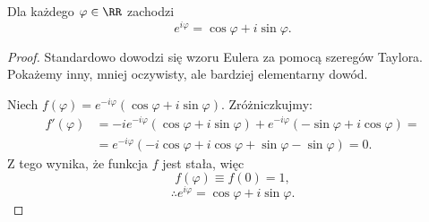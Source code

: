 \begin{theorem}
    Dla każdego $\varphi \in \RR$ zachodzi
    $$ e^{i\varphi} = \cos\varphi + i\sin\varphi. $$
\end{theorem}
\begin{proof}
    Standardowo dowodzi się wzoru Eulera za pomocą szeregów Taylora. Pokażemy inny, mniej oczywisty, ale bardziej elementarny dowód.

    Niech $f(\varphi) = e^{-i\varphi}\left(\cos\varphi + i\sin\varphi\right)$. Zróżniczkujmy:
    \begin{align*}
        f'(\varphi) &= -ie^{-i\varphi}\left(\cos\varphi + i\sin\varphi\right) + e^{-i\varphi}\left(-\sin\varphi + i\cos\varphi\right) = \\
        &= e^{-i\varphi}\left(-i\cos\varphi + i\cos\varphi + \sin\varphi - \sin\varphi\right) = 0.
    \end{align*}
    Z tego wynika, że funkcja $f$ jest stała, więc
    \[ f(\varphi) \equiv f(0) = 1, \]
    \[ \therefore e^{i\varphi} = \cos\varphi + i\sin\varphi. \]
\end{proof}